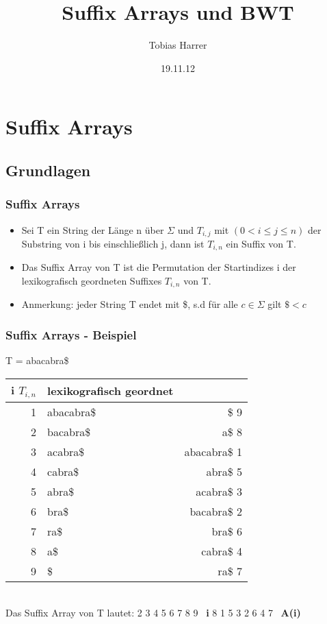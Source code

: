 \documentclass{beamer}
\title{Suffix Arrays und BWT}
\author{Tobias Harrer}
\date{19.11.12}
\begin{document}
\maketitle
 
\begin{frame}
\tableofcontents
\end{frame} 
 
\section{Suffix Arrays}
\subsection{Grundlagen}
\begin{frame} %
  \frametitle{Suffix Arrays} %
  \begin{Definition} %
  \begin{itemize}
  \item Sei T ein String der Länge n über $\Sigma$ und $T_{i,j}$ mit $(0<i\leq j\leq n)$ der Substring von i bis einschließlich j, dann ist $T_{i,n}$ ein Suffix von T.
  \item Das Suffix Array von T ist die Permutation der Startindizes i der lexikografisch geordneten Suffixes $T_{i,n}$ von T.
  \item Anmerkung: jeder String T endet mit \$, s.d für alle $c \in \Sigma$ gilt $\$ < c$ 
  \end{itemize}
  \end{Definition}
\end{frame}
\begin{frame}
\frametitle{Suffix Arrays - Beispiel} %
T = \glqq abacabra\$\grqq\\[5mm]

\begin{tabular}{r|l<{\ttfamily} r<{\ttfamily}}
\textbf{i $T_{i,n}$} & \textbf{lexikografisch geordnet}\\\hline
1 & abacabra\$ & \$ 9\\
2 & bacabra\$ & a\$ 8\\
3 & acabra\$ & abacabra\$ 1\\
4 & cabra\$ & abra\$ 5\\
5 & abra\$ & acabra\$ 3\\
6 & bra\$ & bacabra\$ 2\\
7 & ra\$ & bra\$ 6\\
8 & a\$ & cabra\$ 4\\
9 & \$ & ra\$ 7\\
\end{tabular}\\[5mm]
Das Suffix Array von T lautet: \newline
{\ttfamily
{} 2 3 4 5 6 7 8 9 \textrightarrow\ \textbf{i}\newline
{} 8 1 5 3 2 6 4 7 \textrightarrow\ \textbf{A(i)}
}
\end{frame}
\end{document}
